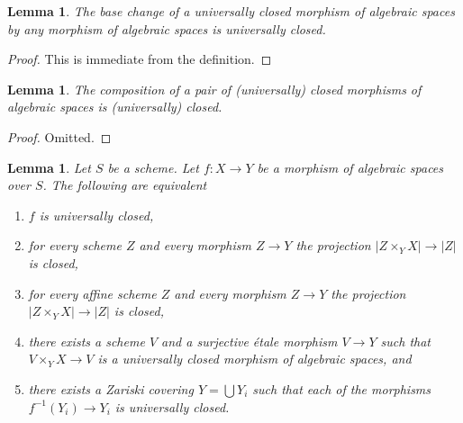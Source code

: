 \documentclass{stacks-project}
\theoremstyle{plain}
\newtheorem{lemma}[subsection]{Lemma}
\theoremstyle{definition}
\theoremstyle{remark}
\numberwithin{equation}{subsection}
\begin{document}
\begin{lemma}
\label{lemma-base-change-universally-closed}
The base change of a universally closed morphism of algebraic spaces
by any morphism of algebraic spaces is universally closed.
\end{lemma}

\begin{proof}
This is immediate from the definition.
\end{proof}

\begin{lemma}
\label{lemma-composition-universally-closed}
The composition of a pair of (universally) closed morphisms of algebraic spaces
is (universally) closed.
\end{lemma}

\begin{proof}
Omitted.
\end{proof}

\begin{lemma}
\label{lemma-universally-closed-local}
Let $S$ be a scheme. Let $f : X \to Y$ be a morphism of algebraic spaces
over $S$. The following are equivalent
\begin{enumerate}
\item $f$ is universally closed,
\item for every scheme $Z$ and every morphism $Z \to Y$
the projection $|Z \times_Y X| \to |Z|$ is closed,
\item for every affine scheme $Z$ and every morphism $Z \to Y$
the projection $|Z \times_Y X| \to |Z|$ is closed,
\item there exists a scheme $V$ and a surjective \'etale morphism
$V \to Y$ such that $V \times_Y X \to V$ is a universally closed morphism
of algebraic spaces, and
\item there exists a Zariski covering $Y = \bigcup Y_i$ such that
each of the morphisms $f^{-1}(Y_i) \to Y_i$ is universally closed.
\end{enumerate}
\end{lemma}
\end{document}
